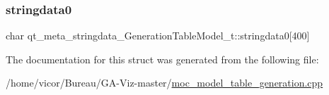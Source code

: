 \subsubsection{\texorpdfstring{stringdata0}{stringdata0}}
{\footnotesize\ttfamily char qt\+\_\+meta\+\_\+stringdata\+\_\+\+Generation\+Table\+Model\+\_\+t\+::stringdata0\mbox{[}400\mbox{]}}



The documentation for this struct was generated from the following file\+:\begin{DoxyCompactItemize}
\item 
/home/vicor/\+Bureau/\+G\+A-\/\+Viz-\/master/\hyperlink{moc__model__table__generation_8cpp}{moc\+\_\+model\+\_\+table\+\_\+generation.\+cpp}\end{DoxyCompactItemize}
